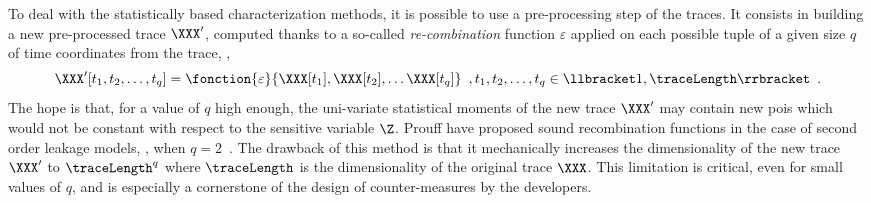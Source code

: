 To deal with the statistically based characterization methods, it is possible to use a pre-processing step of the traces.
It consists in building a new pre-processed trace \(\XXX'\), computed thanks to a so-called \emph{re-combination} function \(\varepsilon\) applied on each possible tuple of a given size \(q\) of time coordinates from the trace, \ie{}, 
\begin{equation}
	\XXX'[t_1, t_2, \ldots, t_q] = \fonction{\varepsilon}{\XXX[t_1], \XXX[t_2], \ldots \XXX[t_q]} \enspace , t_1, t_2, \ldots, t_q \in \llbracket 1, \traceLength \rrbracket \enspace .
\end{equation}
The hope is that, for a value of \(q\) high enough, the uni-variate statistical moments of the new trace \(\XXX'\) may contain new \glspl{poi} which would not be constant with respect to the sensitive variable \(\Z\).
Prouff \etal{} have proposed sound recombination functions in the case of second order leakage models, \ie{}, when \(q=2\)~\cite{prouff_statistical_2009}.
The drawback of this method is that it mechanically increases the dimensionality of the new trace \(\XXX'\) to \(\traceLength^q\) where \(\traceLength\) is the dimensionality of the original trace \(\XXX\).
This limitation is critical, even for small values of \(q\), and is especially a cornerstone of the design of counter-measures by the developers.